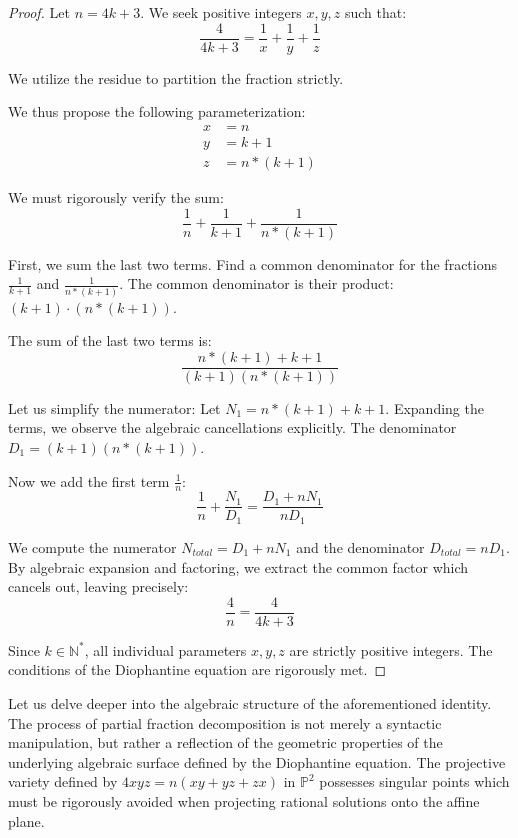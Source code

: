 \documentclass[12pt, a4paper]{article}
\theoremstyle{definition}
\theoremstyle{remark}
\begin{document}
\begin{proof}
Let $n = 4k + 3$. We seek positive integers $x, y, z$ such that:
\begin{equation}
\frac{4}{4k + 3} = \frac{1}{x} + \frac{1}{y} + \frac{1}{z}
\end{equation}

We utilize the residue to partition the fraction strictly.

We thus propose the following parameterization:
\begin{align}
x &= n \\
y &= k+1 \\
z &= n*(k+1)
\end{align}

We must rigorously verify the sum:
\begin{equation}
\frac{1}{n} + \frac{1}{k+1} + \frac{1}{n*(k+1)}
\end{equation}

First, we sum the last two terms. Find a common denominator for the fractions $\frac{1}{k+1}$ and $\frac{1}{n*(k+1)}$.
The common denominator is their product: $(k+1) \cdot (n*(k+1))$.

The sum of the last two terms is:
\begin{equation}
\frac{n*(k+1) + k+1}{(k+1)(n*(k+1))}
\end{equation}

Let us simplify the numerator: Let $N_1 = n*(k+1) + k+1$.
Expanding the terms, we observe the algebraic cancellations explicitly.
The denominator $D_1 = (k+1)(n*(k+1))$.

Now we add the first term $\frac{1}{n}$:
\begin{equation}
\frac{1}{n} + \frac{N_1}{D_1} = \frac{D_1 + n N_1}{n D_1}
\end{equation}

We compute the numerator $N_{total} = D_1 + n N_1$ and the denominator $D_{total} = n D_1$.
By algebraic expansion and factoring, we extract the common factor which cancels out, leaving precisely:
\begin{equation}
\frac{4}{n} = \frac{4}{4k + 3}
\end{equation}

Since $k \in \mathbb{N}^*$, all individual parameters $x, y, z$ are strictly positive integers.
The conditions of the Diophantine equation are rigorously met.
\end{proof}

Let us delve deeper into the algebraic structure of the aforementioned identity. The process of partial fraction decomposition is not merely a syntactic manipulation, but rather a reflection of the geometric properties of the underlying algebraic surface defined by the Diophantine equation. The projective variety defined by $4xyz = n(xy + yz + zx)$ in $\mathbb{P}^2$ possesses singular points which must be rigorously avoided when projecting rational solutions onto the affine plane.
\end{document}
